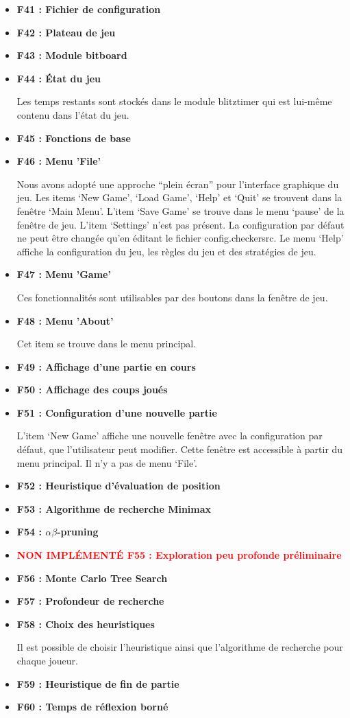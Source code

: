 \documentclass[12pt]{article}
\begin{document}
\begin{itemize}
    L’historique est attaché au fichier de sauvegarde du plateau.
    \item \textbf{F41 : Fichier de configuration}
    \item \textbf{F42 : Plateau de jeu}
    \item \textbf{F43 : Module bitboard}
    \item \textbf{F44 : État du jeu}

    Les temps restants sont stockés dans le module blitztimer qui est lui-même contenu dans l’état du jeu.
    \item \textbf{F45 : Fonctions de base}
    \item \textbf{F46 : Menu 'File'}

    Nous avons adopté une approche “plein écran” pour l'interface graphique du jeu. Les items ‘New Game’, ‘Load Game’, ‘Help’ et ‘Quit’ se trouvent dans la fenêtre ‘Main Menu’. L’item ‘Save Game’ se trouve dans le menu ‘pause’ de la fenêtre de jeu. L’item ‘Settings’ n’est pas présent. La configuration par défaut ne peut être changée qu’en éditant le fichier config.checkersrc.
    Le menu ‘Help’ affiche la configuration du jeu, les règles du jeu et des stratégies de jeu.
    \item \textbf{F47 : Menu ’Game’}

    Ces fonctionnalités sont utilisables par des boutons dans la fenêtre de jeu.
    \item \textbf{F48 : Menu ’About’}
    
    Cet item se trouve dans le menu principal.
    \item \textbf{F49 : Affichage d’une partie en cours}
    \item \textbf{F50 : Affichage des coups joués}
    \item \textbf{F51 : Configuration d’une nouvelle partie}

    L’item ‘New Game’ affiche une nouvelle fenêtre avec la configuration par défaut, que l’utilisateur peut modifier. Cette fenêtre est accessible à partir du menu principal. Il n’y a pas de menu ‘File’.
    \item \textbf{F52 : Heuristique d’évaluation de position}
    \item \textbf{F53 : Algorithme de recherche Minimax}
    \item  \textbf{F54 : $\alpha\beta$-pruning}
    \item \textcolor{red}{\textbf{NON IMPLÉMENTÉ F55 : Exploration peu profonde préliminaire}}
    \item \textbf{F56 : Monte Carlo Tree Search}
    \item \textbf{F57 : Profondeur de recherche}
    \item \textbf{F58 : Choix des heuristiques}
    
    Il est possible de choisir l’heuristique ainsi que l’algorithme de recherche pour chaque joueur.
    \item \textbf{F59 : Heuristique de fin de partie}
    \item \textbf{F60 : Temps de réflexion borné}
\end{itemize}
\end{document}

